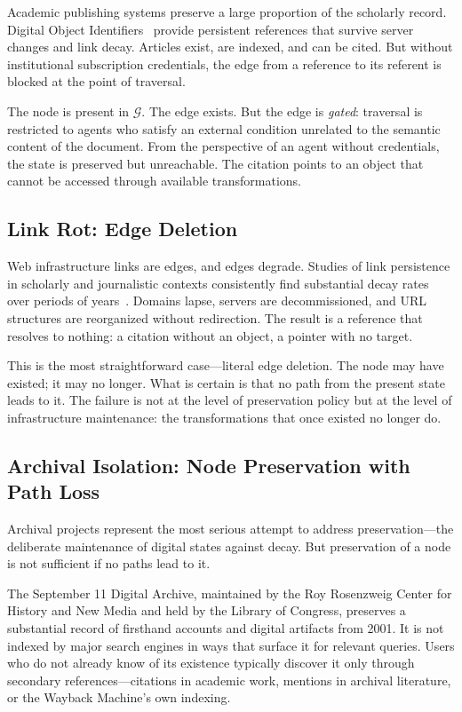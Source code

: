 \documentclass[12pt]{article}
\newcommand{\sG}{\mathcal{G}}
\begin{document}
Academic publishing systems preserve a large proportion of the scholarly
record.
Digital Object Identifiers~\cite{paskin2010} provide persistent references
that survive server changes and link decay.
Articles exist, are indexed, and can be cited.
But without institutional subscription credentials, the edge from a reference
to its referent is blocked at the point of traversal.

The node is present in $\sG$.
The edge exists.
But the edge is \emph{gated}: traversal is restricted to agents who satisfy
an external condition unrelated to the semantic content of the document.
From the perspective of an agent without credentials, the state is
preserved but unreachable.
The citation points to an object that cannot be accessed through available
transformations.

\subsection{Link Rot: Edge Deletion}

Web infrastructure links are edges, and edges degrade.
Studies of link persistence in scholarly and journalistic contexts consistently
find substantial decay rates over periods of years~\cite{klein2014}.
Domains lapse, servers are decommissioned, and URL structures are reorganized
without redirection.
The result is a reference that resolves to nothing: a citation without an
object, a pointer with no target.

This is the most straightforward case---literal edge deletion.
The node may have existed; it may no longer.
What is certain is that no path from the present state leads to it.
The failure is not at the level of preservation policy but at the level of
infrastructure maintenance: the transformations that once existed no longer
do.

\subsection{Archival Isolation: Node Preservation with Path Loss}

Archival projects represent the most serious attempt to address
preservation---the deliberate maintenance of digital states against decay.
But preservation of a node is not sufficient if no paths lead to it.

The September 11 Digital Archive, maintained by the Roy Rosenzweig Center for
History and New Media and held by the Library of Congress, preserves a
substantial record of firsthand accounts and digital artifacts from 2001.
It is not indexed by major search engines in ways that surface it for
relevant queries.
Users who do not already know of its existence typically discover it only
through secondary references---citations in academic work, mentions in
archival literature, or the Wayback Machine's own indexing.
\end{document}
